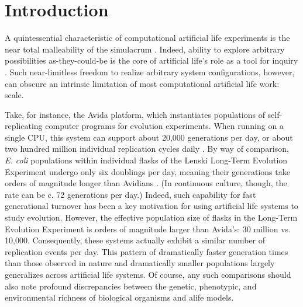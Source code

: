 \section{Introduction}



A quintessential characteristic of computational artificial life experiments is the near total malleability of the simulacrum \citep{pattee1989simulations}.
Indeed, ability to explore arbitrary possibilities as-they-could-be is the core of artificial life's role as a tool for inquiry \citep{langton1997artificial}.
Such near-limitless freedom to realize arbitrary system configurations, however, can obscure an intrinsic limitation of most computational artificial life work: scale.

Take, for instance, the Avida platform, which instantiates populations of self-replicating computer programs for evolution experiments.
When running on a single CPU, this system can support about 20,000 generations per day, or about two hundred million individual replication cycles daily \citep{ofria2009artificial}.
By way of comparison, \textit{E. coli} populations within individual flasks of the Lenski Long-Term Evolution Experiment undergo only six doublings per day, meaning their generations take orders of magnitude longer than Avidians \citep{good2017dynamics}.
(In continuous culture, though, the rate can be c. 72 generations per day.)
Indeed, such capability for fast generational turnover has been a key motivation for using artificial life systems to study evolution.
However, the effective population size of flasks in the Long-Term Evolution Experiment is orders of magnitude larger than Avida's: 30 million vs. 10,000.
Consequently, these systems actually exhibit a similar number of replication events per day.
This pattern of dramatically faster generation times than those observed in nature and dramatically smaller populations largely generalizes across artificial life systems.
Of course, any such comparisons should also note profound discrepancies between the genetic, phenotypic, and environmental richness of biological organisms and alife models.

